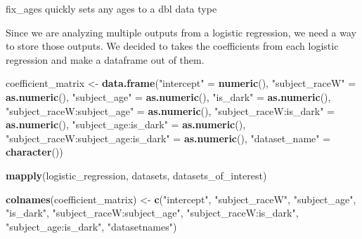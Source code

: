 \documentclass[
]{book}
\newenvironment{Shaded}{\begin{snugshade}}{\end{snugshade}}
\newcommand{\ControlFlowTok}[1]{\textcolor[rgb]{0.13,0.29,0.53}{\textbf{#1}}}
\newcommand{\DataTypeTok}[1]{\textcolor[rgb]{0.13,0.29,0.53}{#1}}
\newcommand{\KeywordTok}[1]{\textcolor[rgb]{0.13,0.29,0.53}{\textbf{#1}}}
\newcommand{\NormalTok}[1]{#1}
\newcommand{\OperatorTok}[1]{\textcolor[rgb]{0.81,0.36,0.00}{\textbf{#1}}}
\newcommand{\StringTok}[1]{\textcolor[rgb]{0.31,0.60,0.02}{#1}}
\begin{document}
fix\_ages quickly sets any ages to a dbl data type

\begin{Shaded}
\end{Shaded}

Since we are analyzing multiple outputs from a logistic regression, we need a way to store those outputs. We decided to takes the coefficients from each logistic regression and make a dataframe out of them.

\begin{Shaded}
\begin{Highlighting}[]
\NormalTok{coefficient_matrix <-}\StringTok{ }\KeywordTok{data.frame}\NormalTok{(}\StringTok{"intercept"}\NormalTok{ =}\StringTok{ }\KeywordTok{numeric}\NormalTok{(), }\StringTok{"subject_raceW"}\NormalTok{ =}\StringTok{ }\KeywordTok{as.numeric}\NormalTok{(), }\StringTok{"subject_age"}\NormalTok{ =}\StringTok{ }\KeywordTok{as.numeric}\NormalTok{(), }\StringTok{"is_dark"}\NormalTok{ =}\StringTok{ }\KeywordTok{as.numeric}\NormalTok{(), }\StringTok{"subject_raceW:subject_age"}\NormalTok{ =}\StringTok{ }\KeywordTok{as.numeric}\NormalTok{(), }\StringTok{"subject_raceW:is_dark"}\NormalTok{ =}\StringTok{ }\KeywordTok{as.numeric}\NormalTok{(), }\StringTok{"subject_age:is_dark"}\NormalTok{ =}\StringTok{ }\KeywordTok{as.numeric}\NormalTok{(), }\StringTok{"subject_raceW:subject_age:is_dark"}\NormalTok{ =}\StringTok{ }\KeywordTok{as.numeric}\NormalTok{(), }\StringTok{"dataset_name"}\NormalTok{ =}\StringTok{ }\KeywordTok{character}\NormalTok{())}

\KeywordTok{mapply}\NormalTok{(logistic_regression, datasets, datasets_of_interest) }

\KeywordTok{colnames}\NormalTok{(coefficient_matrix) <-}\StringTok{ }\KeywordTok{c}\NormalTok{(}\StringTok{"intercept"}\NormalTok{, }\StringTok{"subject_raceW"}\NormalTok{, }\StringTok{"subject_age"}\NormalTok{, }\StringTok{"is_dark"}\NormalTok{, }\StringTok{"subject_raceW:subject_age"}\NormalTok{, }\StringTok{"subject_raceW:is_dark"}\NormalTok{, }\StringTok{"subject_age:is_dark"}\NormalTok{, }\StringTok{"datasetnames"}\NormalTok{)}
\end{Highlighting}
\end{Shaded}
\end{document}
